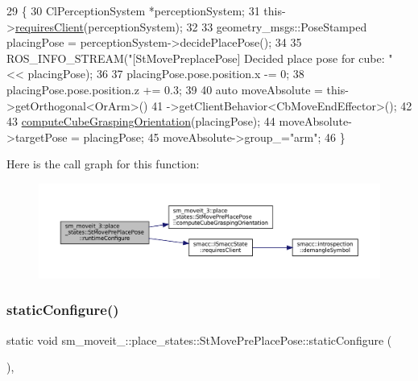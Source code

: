 \begin{DoxyCode}
29     \{
30         ClPerceptionSystem *perceptionSystem;
31         this->\hyperlink{classsmacc_1_1ISmaccState_a7f95c9f0a6ea2d6f18d1aec0519de4ac}{requiresClient}(perceptionSystem);
32 
33         geometry\_msgs::PoseStamped placingPose = perceptionSystem->decidePlacePose();
34 
35         ROS\_INFO\_STREAM(\textcolor{stringliteral}{"[StMovePreplacePose] Decided place pose for cube: "} << placingPose);
36 
37         placingPose.pose.position.x -= 0;
38         placingPose.pose.position.z += 0.3;
39 
40         \textcolor{keyword}{auto} moveAbsolute = this->getOrthogonal<OrArm>()
41                                 ->getClientBehavior<CbMoveEndEffector>();
42 
43         \hyperlink{structsm__moveit__3_1_1place__states_1_1StMovePrePlacePose_a5bb01ef29b186938d8a5f8be09d5f443}{computeCubeGraspingOrientation}(placingPose);
44         moveAbsolute->targetPose = placingPose;
45         moveAbsolute->group\_=\textcolor{stringliteral}{"arm"};
46     \}
\end{DoxyCode}
Here is the call graph for this function\+:
\nopagebreak
\begin{figure}[H]
\begin{center}
\leavevmode
\includegraphics[width=350pt]{structsm__moveit__3_1_1place__states_1_1StMovePrePlacePose_a85efa1e54c69ed395878bd71b24a0e06_cgraph}
\end{center}
\end{figure}
\mbox{\label{structsm__moveit__3_1_1place__states_1_1StMovePrePlacePose_a8bcdfdd7df1625929f6cb2e1652cb806}} 
\subsubsection{\texorpdfstring{static\+Configure()}{staticConfigure()}}
{\footnotesize\ttfamily static void sm\+\_\+moveit\+\_\+::place\+\_\+states\+::\+St\+Move\+Pre\+Place\+Pose\+::static\+Configure (\begin{DoxyParamCaption}{ }\end{DoxyParamCaption})\hspace{0.3cm}{\ttfamily [inline]}, {\ttfamily [static]}}



